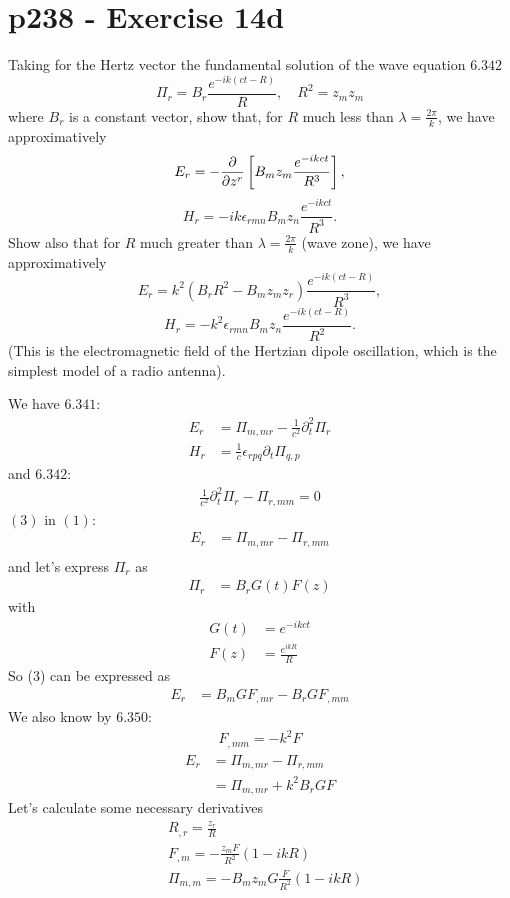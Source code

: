 \section{p238 - Exercise 14d}
\begin{tcolorbox}
Taking for the Hertz vector the fundamental solution of the wave equation $\mathbf{6.342}$
$$\Pi_r=B_r\frac{e^{-ik\left(ct-R\right)}}{R},\quad R^2=z_mz_m$$
where $B_r$ is a constant vector, show that, for $R$ much less than $\lambda=\frac{2\pi}{k}$, we have approximatively
$$E_r= -\pdv{}{z^r}\left[B_mz_m\frac{e^{-ikct}}{R^3}\right],$$
$$H_r= -ik\epsilon_{rmn}B_mz_n\frac{e^{-ikct}}{R^3}.$$
Show also that for $R$ much greater than $\lambda=\frac{2\pi}{k}$ (wave zone), we have approximatively
$$E_r= k^2\left(B_rR^2-B_mz_mz_r\right)\frac{e^{-ik(ct-R)}}{R^3},$$
$$H_r= -k^2\epsilon_{rmn}B_mz_n\frac{e^{-ik(ct-R)}}{R^2}.$$
(This is the electromagnetic field of the Hertzian dipole oscillation, which is the simplest model of a radio antenna).
\end{tcolorbox}
We have $\mathbf{6.341}$:
\begin{align}
E_r&= \Pi_{m,mr}-\frac{1}{c^2}\partial^2_t\Pi_r\\
H_r&= \frac{1}{c}\epsilon_{rpq}\partial_t\Pi_{q,p}
\end{align}
and $\mathbf{6.342}$:
\begin{align}
\frac{1}{c^2}\partial^2_t\Pi_r-\Pi_{r,mm}=0
\end{align}
$(3)$ in $(1)$:
\begin{align}
E_r&= \Pi_{m,mr}-\Pi_{r,mm}\\
\end{align}
and let's express $\Pi_r$ as 
\begin{align}
\Pi_r&= B_rG(t)F(z)
\end{align}
with
\\
\begin{align}
G(t)&=e^{-ikct}\\
F(z)&= \frac{e^{ikR}}{R}
\end{align}
So (3) can be expressed as 
\begin{align}
E_r&= B_mGF_{,mr}-B_rGF_{,mm}
\end{align}We also know by $\mathbf{6.350}$:
\begin{align}
F_{,mm}=-k^2F
\end{align}
\begin{align}
E_r&= \Pi_{m,mr}-\Pi_{r,mm}\\
&= \Pi_{m,mr}+k^2B_rGF
\end{align}
Let's calculate some necessary derivatives
\begin{align}
&R_{,r} = \frac{z_r}{R}\\
&F_{,m} = -\frac{z_mF}{R^2}\left(1-ikR\right)\\
&\Pi_{m,m} = -B_mz_mG\frac{F}{R^2}\left(1-ikR\right)
\end{align}


